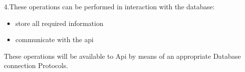 \documentclass[11pt]{article}
\begin{document}
\begin{flushleft}
4.These operations  can be performed in interaction with the database:\\
\begin{itemize}
\item store all required information 	\\
\item communicate with the api \\
 \end{itemize}
These operations will be available to Api by means of an appropriate Database connection Protocols.\\

\end{flushleft}
\end{document}
